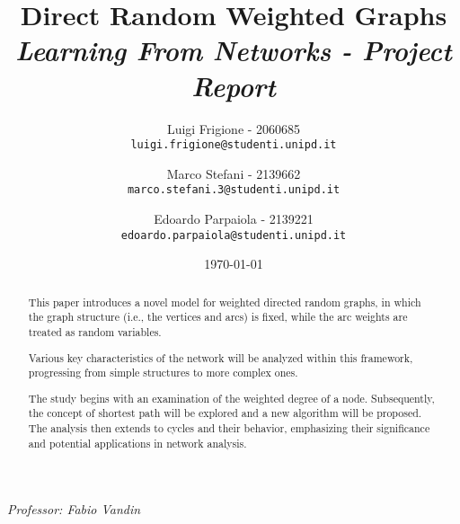 \title{
    \textbf{Direct Random Weighted Graphs}\\[.5cm]
    
    {\large\emph{Learning From Networks - Project Report}}
}

\author{
  Luigi Frigione - 2060685\\
  \texttt{\small{luigi.frigione@studenti.unipd.it}}
  \and
  Marco Stefani - 2139662\\
  \texttt{\small{marco.stefani.3@studenti.unipd.it}}
  \and
  Edoardo Parpaiola - 2139221\\
  \texttt{\small{edoardo.parpaiola@studenti.unipd.it}}
}

\date{\today}

\maketitle

\begin{abstract}
This paper introduces a novel model for weighted directed random graphs, in which the graph structure (i.e., the vertices and arcs) is fixed, while the arc weights are treated as random variables.

Various key characteristics of the network will be analyzed within this framework, progressing from simple structures to more complex ones.

The study begins with an examination of the weighted degree of a node\cite{gonzalez2010an}.
Subsequently, the concept of shortest path will be explored and a new algorithm will be proposed.
The analysis then extends to cycles and their behavior, emphasizing their
significance and potential applications in network analysis.
\end{abstract}

\vfill
{
    \emph{Professor: Fabio Vandin}
}

\newpage

\tableofcontents


